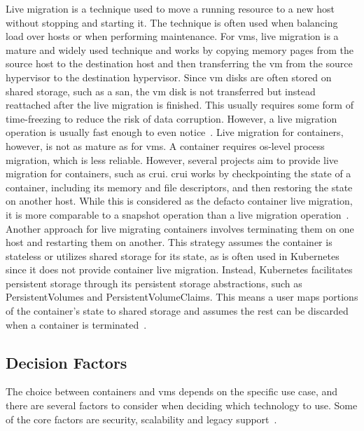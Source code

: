 \documentclass{kththesis}
\begin{document}
\label{container-vm-live-migration}
Live migration is a technique used to move a running resource to a new host without stopping and starting it. The technique is often used when balancing load over hosts or when performing maintenance. For \Glspl{vm}, live migration is a mature and widely used technique and works by copying memory pages from the source host to the destination host and then transferring the \Gls{vm} from the source hypervisor to the destination hypervisor. Since \Gls{vm} disks are often stored on shared storage, such as a \Gls{san}, the \Gls{vm} disk is not transferred but instead reattached after the live migration is finished. This usually requires some form of time-freezing to reduce the risk of data corruption. However, a live migration operation is usually fast enough to even notice\ \cite{vm-live-migration}. Live migration for containers, however, is not as mature as for \Glspl{vm}. A container requires \Gls{os}-level process migration, which is less reliable. However, several projects aim to provide live migration for containers, such as \Gls{crui}. \Gls{crui} works by checkpointing the state of a container, including its memory and file descriptors, and then restoring the state on another host. While this is considered as the defacto container live migration, it is more comparable to a snapshot operation than a live migration operation\ \cite{container-criu-overview, container-criu-linux, container-criu-web}. Another approach for live migrating containers involves terminating them on one host and restarting them on another. This strategy assumes the container is stateless or utilizes shared storage for its state, as is often used in Kubernetes since it does not provide container live migration. Instead, Kubernetes facilitates persistent storage through its persistent storage abstractions, such as PersistentVolumes and PersistentVolumeClaims. This means a user maps portions of the container's state to shared storage and assumes the rest can be discarded when a container is terminated\ \cite{k8s-overview}.

\subsection{Decision Factors}
The choice between containers and \Glspl{vm} depends on the specific use case, and there are several factors to consider when deciding which technology to use. Some of the core factors are security, scalability and legacy support\ \cite{container-vm-comparison}. 
\end{document}
